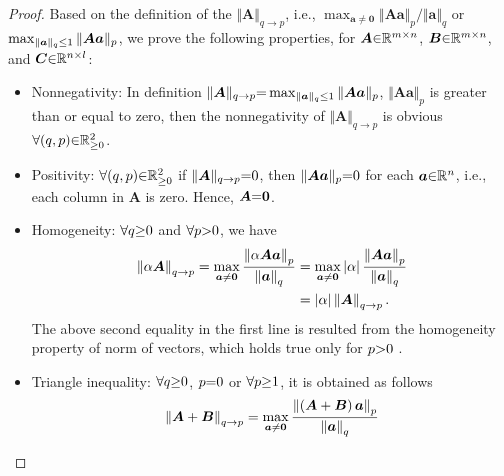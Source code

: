 \begin{proof}
Based on the definition of the $\Vert \boldsymbol{A} \Vert_{q \to p}$, i.e., $\max_{\boldsymbol{a} \neq \boldsymbol{0}} \Vert \boldsymbol{A} \boldsymbol{a} \Vert_{p} / \Vert \boldsymbol{a} \Vert_{q}$ or $\max_{\Vert \boldsymbol{a} \Vert_q {\leq} 1} \Vert \boldsymbol{A} \boldsymbol{a} \Vert_{p}$, we prove the following properties, for $\boldsymbol{A} {\in} \mathbb{R}^{m {\times} n}$, $\boldsymbol{B} {\in} \mathbb{R}^{m {\times} n}$, and $\boldsymbol{C} {\in} \mathbb{R}^{n {\times} l}$:
\begin{itemize}
\item Nonnegativity: In definition $\Vert \boldsymbol{A} \Vert_{q \to p} {=} \max_{\Vert \boldsymbol{a} \Vert_q {\leq} 1} \Vert \boldsymbol{A} \boldsymbol{a} \Vert_{p}$, $\Vert \boldsymbol{A} \boldsymbol{a} \Vert_{p}$ is greater than or equal to zero, then the nonnegativity of $\Vert \boldsymbol{A} \Vert_{q \to p}$ is obvious $\forall (q , p) {\in} \mathbb{R}^2_{{\geq} 0}$. 
\item Positivity: $\forall (q , p) {\in} \mathbb{R}^2_{{\geq} 0}$ if $\Vert \boldsymbol{A} \Vert_{q \to p} {=} 0$, then $\Vert \boldsymbol{A} \boldsymbol{a} \Vert_{p} {=} 0$ for each $\boldsymbol{a} {\in} \mathbb{R}^n$, i.e., each column in $\boldsymbol{A}$ is zero. 
Hence, $\boldsymbol{A} {=} \boldsymbol{0}$.
\item Homogeneity: $\forall q {\geq} 0$ and $\forall p {>} 0$, we have
\begin{gather*} 
\begin{aligned}
\left\lVert\alpha \boldsymbol{A}\right\rVert_{q \to p} = \max_{\boldsymbol{a} \neq \boldsymbol{0}} \frac{\left\lVert\alpha \boldsymbol{A} \boldsymbol{a} \right\rVert_{p}}{\left\lVert \boldsymbol{a}\right\rVert_{q}} 
&= \max_{\boldsymbol{a} \neq \boldsymbol{0}} \left\lvert\alpha\right\rvert \frac{\left\lVert\boldsymbol{A} \boldsymbol{a}\right\rVert_{p}}{\left\lVert\boldsymbol{a}\right\rVert_{q}} \\
&= \left\lvert\alpha\right\rvert \left\lVert\boldsymbol{A}\right\rVert_{q \to p}.
\end{aligned}
\end{gather*}
The above second equality in the first line is resulted from the homogeneity property of norm of vectors, which holds true only for $p {>} 0$ \cite{Elad2010,Golub2013}.
\item Triangle inequality: $\forall q {\geq} 0$, $p {=} 0$ or $\forall p {\geq} 1$, it is obtained as follows
\begin{gather*}
\begin{aligned}
\mynorm{\boldsymbol{A} + \boldsymbol{B}}_{q \to p} = 
\max_{\boldsymbol{a} \neq \boldsymbol{0}} \frac{\mynorm{\myparanthese{\boldsymbol{A} + \boldsymbol{B}} \boldsymbol{a}}_{p}}{\mynorm{\boldsymbol{a}}_{q}} 

\end{aligned}
\end{gather*}
\end{itemize}
\end{proof}
